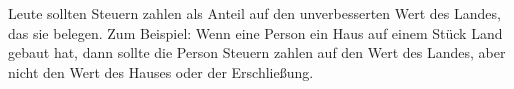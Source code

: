 Leute sollten Steuern zahlen als Anteil auf den unverbesserten Wert des Landes, das sie belegen.
Zum Beispiel: Wenn eine Person ein Haus auf einem Stück Land gebaut hat, dann sollte die Person Steuern zahlen auf den Wert des Landes, aber nicht den Wert des Hauses oder der Erschließung.